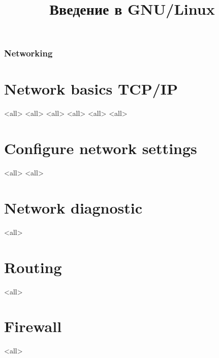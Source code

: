 

\title{Введение в GNU/Linux}




\begin{frame}
	\frametitle{Networking}
	\titlepage
	\vspace{-0.5cm}
	\begin{center}
	\end{center}
\end{frame}


\begin{frame}
	\tableofcontents
	[hideallsubsections]
\end{frame}


\section{Network basics TCP/IP}
\mode<all>{}
\mode<all>{}
\mode<all>{}
\mode<all>{}
\mode<all>{}
\mode<all>{}
\section{Configure network settings}
\mode<all>{}
\mode<all>{}
\section{Network diagnostic}
\mode<all>{}
\section{Routing}
\mode<all>{}
\section{Firewall}
\mode<all>{}


